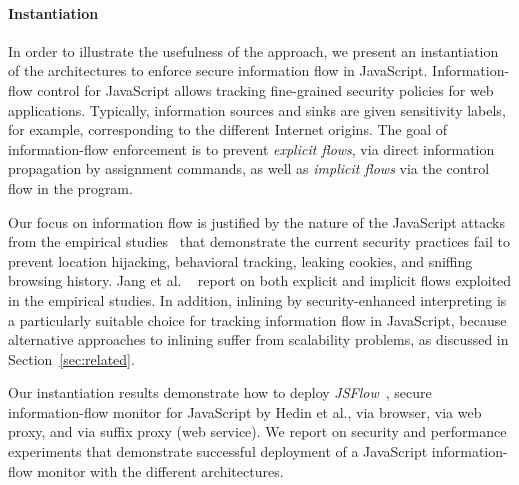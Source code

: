 \documentclass{llncs}
\begin{document}
\paragraph{Instantiation}
In order to illustrate the usefulness of the approach, we present an
instantiation of the architectures to enforce secure information flow
in JavaScript. Information-flow control for JavaScript allows tracking
fine-grained security policies for web applications. Typically,
information sources  and sinks are given sensitivity labels, for
example, corresponding to the different Internet origins. The goal of
information-flow enforcement is to prevent \emph{explicit flows}, via
direct information propagation by assignment commands, as well as
\emph{implicit flows} via the control flow in the program.

Our focus on information flow is justified by
the nature of the JavaScript attacks from the empirical
studies~\cite{Jang+:CCS10,Nikiforakis+:CCS12} that demonstrate the current security
practices fail to  prevent 
location
hijacking, behavioral tracking, leaking cookies, and sniffing browsing
history. Jang et al. ~\cite{Jang+:CCS10} report on both explicit and
implicit flows exploited in the empirical studies.
%
In addition, inlining by security-enhanced interpreting is a
particularly suitable choice for tracking information flow in
JavaScript, because alternative approaches to inlining suffer from
scalability problems, as discussed in Section~\ref{sec:related}. 

Our instantiation results demonstrate how to deploy
\emph{JSFlow}~\cite{Hedin:Sabelfeld:CSF12,JSFlow}, secure information-flow
monitor for JavaScript by Hedin et al., via
browser, via web proxy, and via suffix proxy (web service).
%
We report on security and performance experiments that demonstrate successful deployment of a JavaScript
information-flow monitor with the different architectures.




\end{document}
